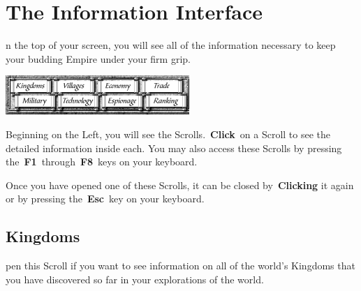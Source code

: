 
\chapter{The Information Interface}


n the top of your screen, you will see all of the information necessary to keep your budding Empire under your firm grip.

\begin{center}
	\includegraphics[width=0.7\linewidth]{Iscrolls}
\end{center}

Beginning on the Left, you will see the Scrolls. \textbf{Click} on a Scroll to see the detailed information inside each. You may also access these Scrolls by pressing the \textbf{F1} through \textbf{F8} keys on your keyboard.

Once you have opened one of these Scrolls, it can be closed by \textbf{Clicking} it again or by pressing the \textbf{Esc} key on your keyboard.

\section{Kingdoms}

pen this Scroll if you want to see information on all of the world’s Kingdoms that you have discovered so far in your explorations of the world.

